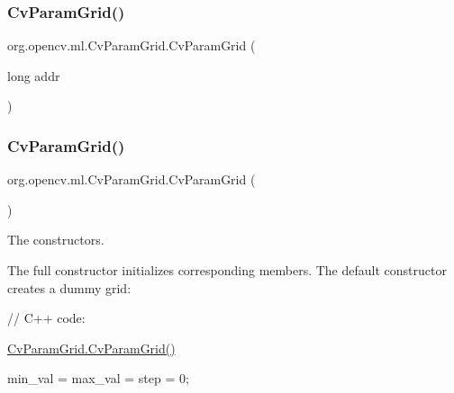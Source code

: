 \subsubsection{\texorpdfstring{Cv\+Param\+Grid()}{CvParamGrid()}\hspace{0.1cm}{\footnotesize\ttfamily [1/2]}}
{\footnotesize\ttfamily org.\+opencv.\+ml.\+Cv\+Param\+Grid.\+Cv\+Param\+Grid (\begin{DoxyParamCaption}\item[{long}]{addr }\end{DoxyParamCaption})\hspace{0.3cm}{\ttfamily [protected]}}

\mbox{\label{classorg_1_1opencv_1_1ml_1_1_cv_param_grid_a409b566be9702a9f184fd0a548ee3d92}} 
\subsubsection{\texorpdfstring{Cv\+Param\+Grid()}{CvParamGrid()}\hspace{0.1cm}{\footnotesize\ttfamily [2/2]}}
{\footnotesize\ttfamily org.\+opencv.\+ml.\+Cv\+Param\+Grid.\+Cv\+Param\+Grid (\begin{DoxyParamCaption}{ }\end{DoxyParamCaption})}

The constructors.

The full constructor initializes corresponding members. The default constructor creates a dummy grid\+:

{\ttfamily }

{\ttfamily }

{\ttfamily }

{\ttfamily // C++ code\+:}

{\ttfamily }

{\ttfamily }

{\ttfamily \mbox{\hyperlink{classorg_1_1opencv_1_1ml_1_1_cv_param_grid_a409b566be9702a9f184fd0a548ee3d92}{Cv\+Param\+Grid.\+Cv\+Param\+Grid()}}}

{\ttfamily }

{\ttfamily }

{\ttfamily min\+\_\+val = max\+\_\+val = step = 0;}

